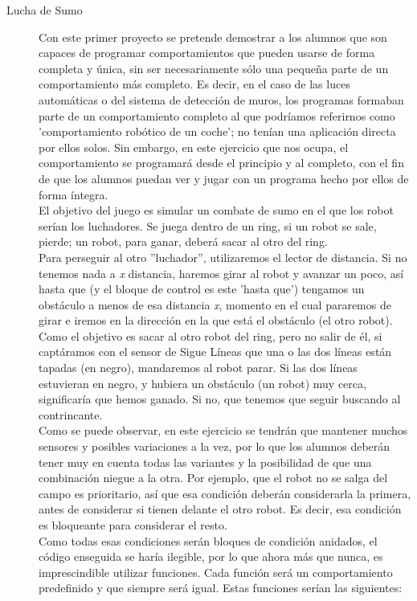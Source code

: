 \begin{description}
	\item[Lucha de Sumo]\label{ej:sumo}
	Con este primer proyecto se pretende demostrar a los alumnos que son capaces de programar comportamientos que pueden usarse de forma completa y única, sin ser necesariamente sólo una pequeña parte de un comportamiento más completo. Es decir, en el caso de las luces automáticas o del sistema de detección de muros, los programas formaban parte de un comportamiento completo al que podríamos referirnos como \break 'comportamiento robótico de un coche'; no tenían una aplicación directa por ellos solos. Sin embargo, en este ejercicio que nos ocupa, el comportamiento se programará desde el principio y al completo, con el fin de que los alumnos puedan ver y jugar con un programa hecho por ellos de forma íntegra. \\
	El objetivo del juego es simular un combate de sumo en el que los robot serían los luchadores. Se juega dentro de un ring, si un robot se sale, pierde; un robot, para ganar, deberá sacar al otro del ring. \\
	Para perseguir al otro ''luchador'', utilizaremos el lector de distancia. Si no tenemos nada a \textit{x} distancia, haremos girar al robot y avanzar un poco, así hasta que (y el bloque de control es este 'hasta que') tengamos un obstáculo a menos de esa distancia \textit{x}, momento en el cual pararemos de girar e iremos en la dirección en la que está el obstáculo (el otro robot). Como el objetivo es sacar al otro robot del ring, pero no salir de él, si captáramos con el sensor de Sigue Líneas que una o las dos líneas están tapadas (en negro), mandaremos al robot parar. Si las dos líneas estuvieran en negro, y hubiera un obstáculo (un robot) muy cerca, significaría que hemos ganado. Si no, que tenemos que seguir buscando al contrincante.\\	
	Como se puede observar, en este ejercicio se tendrán que mantener muchos sensores y posibles variaciones a la vez, por lo que los alumnos deberán tener muy en cuenta todas las variantes y la posibilidad de que una combinación niegue a la otra. Por ejemplo, que el robot no se salga del campo es prioritario, así que esa condición deberán considerarla la primera, antes de considerar si tienen delante el otro robot. Es decir, esa condición es bloqueante para considerar el resto.\\
	Como todas esas condiciones serán bloques de condición anidados, el código enseguida se haría ilegible, por lo que ahora más que nunca, es imprescindible utilizar funciones. Cada función será un comportamiento predefinido y que siempre será igual. Estas funciones serían las siguientes:

\end{description}
